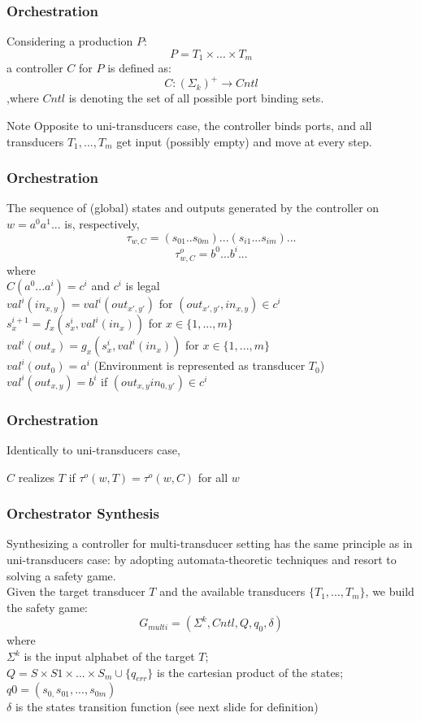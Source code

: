 \documentclass{beamer}
\theoremstyle{definition}
\theoremstyle{plain}
\begin{document}
\begin{frame}
\frametitle{Orchestration}
Considering a production $P$:
$$P = T_{1} \times . . . \times T_{m}$$
a controller $C$ for $P$ is defined as:
$$C : (\Sigma_{k})^{+} \to Cntl$$
,where $Cntl$ is denoting the set of all possible port binding sets.\\
\begin{alertblock}{Note}
Opposite to uni-transducers case, the controller binds ports, and all transducers $T_{1}, . . . , T_{m}$ get input (possibly empty) and move at every step.
\end{alertblock}
\end{frame}

\begin{frame}
\frametitle{Orchestration}
The sequence of (global) states and outputs generated by the controller on $w = a^{0}a^{1}. . . $ is, respectively,
$$\tau_{w,C} = (s_{01} . . s_{0m}) . . . (s_{i1} . . . s_{im}) . . . $$
$$\tau^{o}_{w,C} = b^{0} . . . b^{i} . . .$$
where\\
$C(a^{0} . . . a^{i}) = c^{i}$ and $c^{i}$ is legal \\
$val^{i}(in_{x,y}) = val^{i}(out_{x',y'})$ for $ (out_{x', y'}, in_{x, y}) \in c^{i}$\\
$s^{i+1}_{x} = f_{x}(s^{i}_{x}, val^{i}(in_{x}))$ for $ x \in \{1, . . . ,m\}$\\
$val^{i}(out_{x}) = g_{x}(s^{i}_{x}, val^{i}(in_{x}))$ for $ x \in \{1, . . . ,m\}$\\
$val^{i}(out_{0}) = a^{i}$ (Environment is represented as transducer $T_{0}$)\\
$val^{i}(out_{x,y}) = b^{i}$ if $(out_{x,y} in_{0,y'}) \in c^{i}$
\end{frame}

\begin{frame}
\frametitle{Orchestration}
Identically to uni-transducers case,
\begin{theorem}
$C$ realizes $T$ if $\tau^{o}(w, T) = \tau^{o}(w, C)$ for all $w$
\end{theorem}
\end{frame}

\begin{frame}
\frametitle{Orchestrator Synthesis}
Synthesizing a controller for multi-transducer setting has the same principle as in uni-transducers case:  by adopting automata-theoretic techniques and resort to solving a safety game.\\
Given the target transducer $T$ and the available transducers $\{T_{1}, . . . ,T_{m}\}$, we build the safety
game:
$$G_{multi} = (\Sigma^{k}, Cntl, Q, q_{0}, \delta)$$
where\\
$\Sigma^{k}$ is the input alphabet of the target $T$;\\
$Q = S \times S1\times . . . \times S_{m} \cup \{q_{err}\}$ is the cartesian product of the states;\\
$q0 = (s_{0,} s_{01}, . . . , s_{0m})$\\
$\delta$ is the states transition function (see next slide for definition)
\end{frame}
\end{document}
